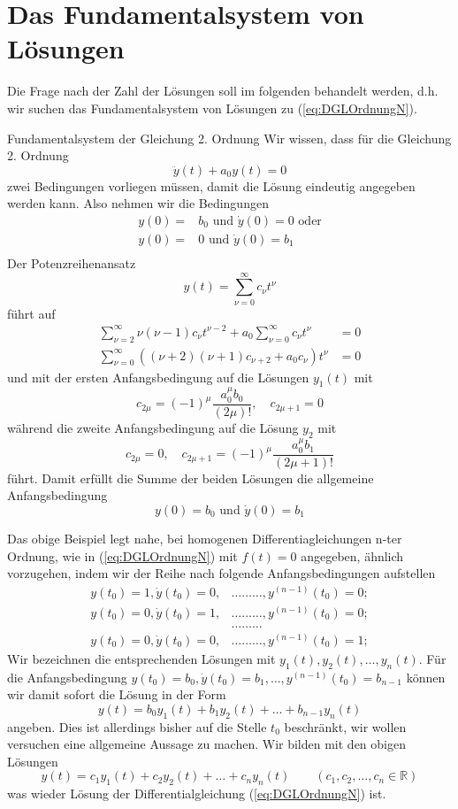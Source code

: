 \section{Das Fundamentalsystem von Lösungen}
Die Frage nach der Zahl der Lösungen soll im folgenden behandelt werden, d.h.
wir suchen das Fundamentalsystem von Lösungen zu (\ref{eq:DGLOrdnungN}).
\begin{example}{Fundamentalsystem der Gleichung 2. Ordnung}
  Wir wissen, dass für die Gleichung 2. Ordnung 
  \[\ddot{y}(t)+a_0y(t)=0 \]
  zwei Bedingungen vorliegen müssen, damit die Lösung eindeutig angegeben werden
  kann. Also nehmen wir die Bedingungen
  \begin{align}
  y(0)=&b_0\mbox{ und }\dot{y}(0)=0\mbox{ oder}\nonumber\\
  y(0)=&0\mbox{ und }\dot{y}(0)=b_1\nonumber\\
  \end{align}
  Der Potenzreihenansatz
  \[ y(t)=\sum\limits_{\nu=0}^\infty c_\nu t^\nu \]
  führt auf
  \begin{align*}
  \sum\limits_{\nu=2}^\infty\nu(\nu-1)c_\nu t^{\nu-2}+a_0\sum\limits_{\nu=0}^\infty c_\nu t^\nu &=0\\
  \sum\limits_{\nu=0}^\infty\left( (\nu+2)(\nu+1)c_{\nu+2} +a_0c_\nu\right) t^\nu &=0
  \end{align*}
  und mit der ersten Anfangsbedingung auf die Lösungen $y_1(t)$ mit
  \[ c_{2\mu}=(-1)^\mu\frac{a_0^\mu b_0}{(2\mu)!},\quad c_{2\mu+1}=0\]
  während die zweite Anfangsbedingung auf die Lösung $y_2$ mit
  \[ c_{2\mu}=0, \quad c_{2\mu+1}=(-1)^\mu\frac{a_0^\mu b_1}{(2\mu+1)!}\]
  führt. Damit erfüllt die Summe der beiden Lösungen die allgemeine
  Anfangsbedingung
  \[ y(0)=b_0\mbox{ und }\dot{y}(0)=b_1\]
\end{example}
Das obige Beispiel legt nahe, bei homogenen Differentiagleichungen n-ter
Ordnung, wie in (\ref{eq:DGLOrdnungN}) mit $f(t)=0$ angegeben, ähnlich
vorzugehen, indem wir der Reihe nach folgende Anfangsbedingungen aufstellen
\begin{align*}
  y(t_0)=1,\dot{y}(t_0)=0,&\dots\dots\dots,y^{(n-1)}(t_0)=0;\\
  y(t_0)=0,\dot{y}(t_0)=1,&\dots\dots\dots,y^{(n-1)}(t_0)=0;\\
  &\dots\dots\dots \\
  y(t_0)=0,\dot{y}(t_0)=0,&\dots\dots\dots,y^{(n-1)}(t_0)=1;
  \label{eq:NICs}
\end{align*}
Wir bezeichnen die entsprechenden Lösungen mit $y_1(t),y_2(t),\dots,y_n(t)$.
Für die Anfangsbedingung
$y(t_0)=b_0,\dot{y}(t_0)=b_1,\dots,y^{(n-1)}(t_0)=b_{n-1}$ können wir damit
sofort die Lösung in der Form
\begin{equation}
  y(t)=b_0y_1(t)+b_1y_2(t)+\dots+b_{n-1}y_n(t)
  \label{eq:FundamentalSuperpose}
\end{equation}
angeben. Dies ist allerdings bisher auf die Stelle $t_0$ beschränkt, wir wollen
versuchen eine allgemeine Aussage zu machen. Wir bilden mit den obigen Lösungen 
\[y(t)=c_1y_1(t)+c_2y_2(t)+\dots+c_ny_n(t)\qquad (c_1,c_2,\dots,c_n\in\mathbb{R})\]
was wieder Lösung der Differentialgleichung (\ref{eq:DGLOrdnungN}) ist.

